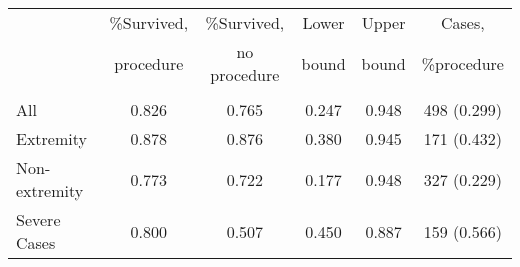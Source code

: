 \begin{tabular}{lccccc} \hline \hline
                     &  \%Survived, & \%Survived,  &Lower  & Upper & Cases,  \\
                     & procedure    & no procedure & bound & bound & \%procedure \\ \hline
                     &              &              &       &       &                 \\
All                  & 0.826        &  0.765       & 0.247 & 0.948 & 498 (0.299)     \\
Extremity            & 0.878        &  0.876       & 0.380 & 0.945 & 171 (0.432)     \\
Non-extremity        & 0.773        &  0.722       & 0.177 & 0.948 & 327 (0.229)     \\
Severe Cases         & 0.800        &  0.507       & 0.450 & 0.887 & 159 (0.566)     \\ \hline
\end{tabular}